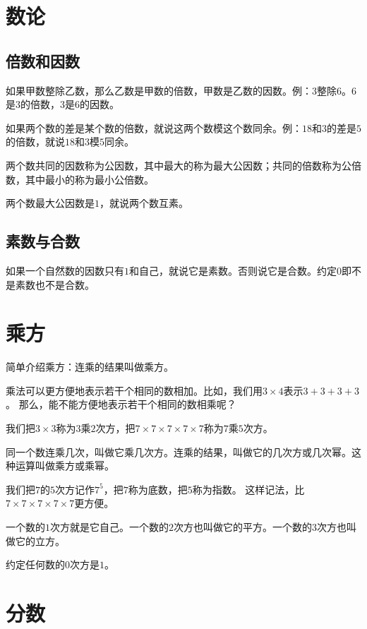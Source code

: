\documentclass[12pt,UTF8]{ctexbook}
\begin{document}
\section{数论}

\subsection{倍数和因数}

如果甲数整除乙数，那么乙数是甲数的倍数，甲数是乙数的因数。例：\( 3 \)整除\( 6 \)。\( 6 \)是\( 3 \)的倍数，\( 3 \)是\( 6 \)的因数。

如果两个数的差是某个数的倍数，就说这两个数模这个数同余。例：\( 18 \)和\( 3 \)的差是\( 5 \)的倍数，就说\( 18 \)和\( 3 \)模\( 5 \)同余。

两个数共同的因数称为公因数，其中最大的称为最大公因数；共同的倍数称为公倍数，其中最小的称为最小公倍数。

两个数最大公因数是\( 1 \)，就说两个数互素。

\subsection{素数与合数}

如果一个自然数的因数只有\( 1 \)和自己，就说它是素数。否则说它是合数。约定\( 0 \)即不是素数也不是合数。

\section{乘方}

简单介绍乘方：连乘的结果叫做乘方。

乘法可以更方便地表示若干个相同的数相加。比如，我们用\( 3 \times 4 \)表示\( 3+3+3+3 \)。
那么，能不能方便地表示若干个相同的数相乘呢？

我们把\( 3\times 3 \)称为\( 3 \)乘\( 2 \)次方，把\( 7\times 7\times 7\times 7\times 7 \)称为\( 7 \)乘\( 5 \)次方。

同一个数连乘几次，叫做它乘几次方。连乘的结果，叫做它的几次方或几次幂。这种运算叫做乘方或乘幂。

我们把\( 7 \)的\( 5 \)次方记作\( 7^5 \)，把\( 7 \)称为底数，把\( 5 \)称为指数。
这样记法，比\( 7\times 7\times 7\times 7\times 7 \)更方便。

一个数的\( 1 \)次方就是它自己。一个数的\( 2 \)次方也叫做它的平方。一个数的\( 3 \)次方也叫做它的立方。

约定任何数的\( 0 \)次方是\( 1 \)。

\section{分数}
\end{document}
